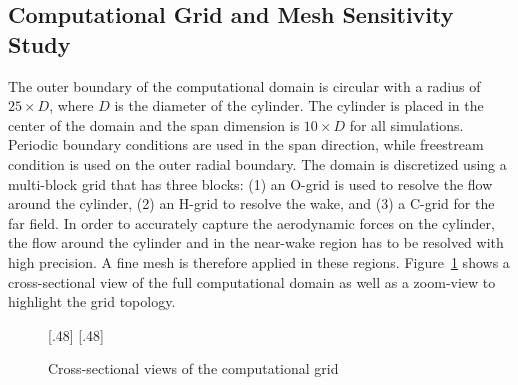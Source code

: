 \subsection{Computational Grid and Mesh Sensitivity Study}
\label{sec:grids}
%
The outer boundary of the computational domain is circular with a radius of
$25\times D$, where $D$ is the diameter of the cylinder. The cylinder is placed
in the center of the domain and the span dimension is $10\times D$ for all
simulations. Periodic boundary conditions are used in the span direction, while
freestream condition is used on the outer radial boundary. The domain is
discretized using a multi-block grid that has three blocks: (1) an O-grid is
used to resolve the flow around the cylinder, (2) an H-grid to resolve the
wake, and (3) a C-grid for the far field. In order to accurately capture the
aerodynamic forces on the cylinder, the flow around the cylinder and in the
near-wake region has to be resolved with high precision. A fine mesh is
therefore applied in these regions. Figure~\ref{fig:Mesh} shows a
cross-sectional view of the full computational domain as well as a zoom-view to
highlight the grid topology.
%
\begin{figure}[htb!]
  \centering
    [.48\linewidth]{}
  \hspace*{\fill}
    [.48\linewidth]{}
  \caption{Cross-sectional views of the computational grid}
  \label{fig:Mesh}
\end{figure}

